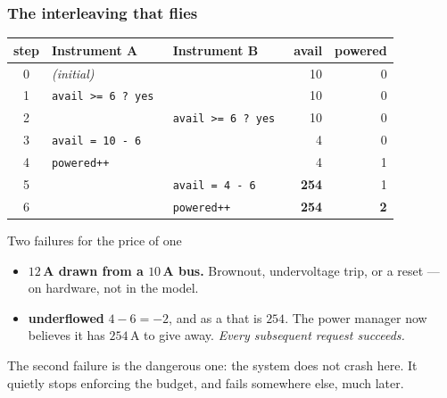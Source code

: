 \begin{frame}
  \frametitle{The interleaving that flies} \small

\begin{center}\scriptsize
\begin{tabular}{c l l r r}
\toprule
{\bf step} & {\bf Instrument A} & {\bf Instrument B} & {\bf avail} & {\bf powered}\\
\midrule
0 & \multicolumn{2}{l}{\em (initial)}                       & 10 & 0\\
1 & \tt avail >= 6 ? yes  &                                 & 10 & 0\\
\rowcolor{red!8}
2 &                       & \tt avail >= 6 ? yes            & 10 & 0\\
3 & \tt avail = 10 - 6    &                                 &  4 & 0\\
4 & \tt powered++         &                                 &  4 & 1\\
5 &                       & \tt avail = 4 - 6               & \bf 254 & 1\\
6 &                       & \tt powered++                   & \bf 254 & \bf 2\\
\bottomrule
\end{tabular}
\end{center}

\pause
\vspace{0.3cm}

\begin{block}{Two failures for the price of one}\small
\begin{itemize}
\item {\bf $12\,$A drawn from a $10\,$A bus.} Brownout, undervoltage trip, or a
      reset --- on hardware, not in the model.
\item {\bf {} underflowed} $4-6 = -2$, and as a  that is
      $254$. The power manager now believes it has $254\,$A to give away.
      {\em Every subsequent request succeeds.}
\end{itemize}
\end{block}

\pause

The second failure is the dangerous one: the system does not crash here.
It quietly stops enforcing the budget, and fails somewhere else, much later.

\end{frame}

